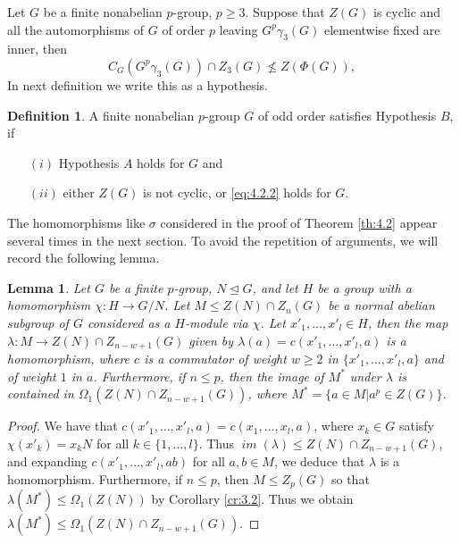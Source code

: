 \documentclass[preprint,sort&compress,12pt]{elsarticle}
\newtheorem{lemma}[theorem]{Lemma}
\theoremstyle{definition}
\newtheorem{definition}[theorem]{Definition}
\numberwithin{equation}{theorem}
\DeclareMathOperator{\im}{\mathit{im}}
\begin{document}
Let $G$ be a finite nonabelian $p$-group, $p\ge 3$. Suppose that $Z(G)$ is cyclic and all the automorphisms of $G$ of order $p$ leaving $G^p\gamma_3(G)$ elementwise fixed are inner, then 
\begin{equation}\label{eq:4.2.2}
C_G(G^p\gamma_3(G))\cap Z_3(G)\not\leq Z(\Phi(G)),
\end{equation}
\noindent In next definition we write this as a hypothesis.

\begin{definition}
A finite nonabelian $p$-group $G$ of odd order satisfies Hypothesis $B$, if
\begin{itemize}
\item [$(i)$] Hypothesis $A$ holds for $G$ and
\item [$(ii)$] either $Z(G)$ is not cyclic, or \eqref{eq:4.2.2} holds for $G$.
\end{itemize}
\end{definition}
 
The homomorphisms like $\sigma$ considered in the proof of Theorem \ref{th:4.2} appear several times in the next section. To avoid the repetition of arguments, we will record the following lemma.

\begin{lemma}\label{L:4.4}
Let $G$ be a finite $p$-group, $N\unlhd G$, and let $H$ be a group with a homomorphism $\chi:H\rightarrow G/N$. Let $M\le Z(N)\cap Z_n(G)$ be a normal abelian subgroup of $G$ considered as a $H$-module via $\chi$. Let $x'_1, \ldots, x'_l\in H$, then the map $\lambda:M\rightarrow Z(N)\cap Z_{n-w+1}(G)$ given by $\lambda(a)=c(x'_1, \ldots, x'_l, a)$ is a homomorphism, where $c$ is a commutator of weight $w\ge 2$ in $\{x'_1, \ldots, x'_l, a\}$ and of weight $1$ in $a$. Furthermore, if $n\le p$, then the image of $M^*$ under $\lambda$ is contained in $\Omega_1(Z(N)\cap Z_{n-w+1}(G))$, where $M^*=\{a\in M| a^p\in Z(G)\}$. 
\end{lemma}

\begin{proof}
We have that $c(x'_1, \ldots, x'_l, a)= c( x_1, \dots, x_l, a)$, where $x_k\in G$ satisfy $\chi(x'_k)= x_kN$ for all $k\in \{1, \ldots, l\}$. Thus $\im(\lambda)\le Z(N)\cap Z_{n-w+1}(G)$, and expanding $c(x'_1, \ldots, x'_l, ab)$ for all $a, b\in M$, we deduce that $\lambda$ is a homomorphism. Furthermore, if $n\le p$, then $M\le Z_p(G)$ so that $\lambda(M^*)\le \Omega_1(Z(N))$ by Corollary \ref{cr:3.2}. Thus we obtain $\lambda(M^*)\le \Omega_1(Z(N)\cap Z_{n-w+1}(G))$. 
\end{proof}
\end{document}

